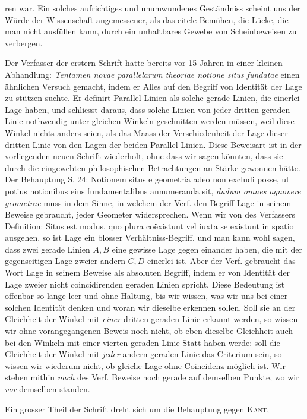 %
ren war. Ein solches aufrichtiges und unumwundenes Geständniss scheint uns der Würde der Wissenschaft angemessener, als das eitele Bemühen, die Lücke, die man nicht ausfüllen kann, durch ein unhaltbares Gewebe von Scheinbeweisen zu verbergen.

Der Verfasser der erstern Schrift hatte bereits vor 15 Jahren in einer kleinen Abhandlung: \textit{Tentamen novae parallelarum theoriae notione situs fundatae} einen ähnlichen Versuch gemacht, indem er Alles auf den Begriff von Identität der Lage zu stützen suchte. Er definirt Parallel-Linien als solche gerade Linien, die einerlei Lage haben, und schliesst daraus, dass solche Linien von jeder dritten geraden Linie nothwendig unter gleichen Winkeln geschnitten werden müssen, weil diese Winkel nichts anders seien, als das Maass der Verschiedenheit der Lage dieser dritten Linie von den Lagen der beiden Parallel-Linien. Diese Beweisart ist in der vorliegenden neuen Schrift wiederholt, ohne dass wir sagen könnten, dass sie durch die eingewebten philosophischen Betrachtungen an Stärke gewonnen hätte. Der Behauptung S. 24: Notionem situs e geometria adeo non excludi posse, ut potius notionibus eius fundamentalibus annumeranda sit, \textit{dudum omnes agnovere geometrae} muss in dem Sinne, in welchem der Verf. den Begriff Lage in seinem Beweise gebraucht, jeder Geometer widersprechen. Wenn wir von des Verfassers Definition: Situs est modus, quo plura coëxistunt vel iuxta se existunt in spatio ausgehen, so ist Lage ein blosser Verhältniss-Begriff, und man kann wohl sagen, dass zwei gerade Linien \(A,B\) eine gewisse Lage gegen einander haben, die mit der gegenseitigen Lage zweier andern \(C,D\) einerlei ist. Aber der Verf. gebraucht das Wort Lage in seinem Beweise als absoluten Begriff, indem er von Identität der Lage zweier nicht coincidirenden geraden Linien spricht. Diese Bedeutung ist offenbar so lange leer und ohne Haltung, bis wir wissen, was wir uns bei einer solchen Identität denken und woran wir dieselbe erkennen sollen. Soll sie an der Gleichheit der Winkel mit \textit{einer} dritten geraden Linie erkannt werden, so wissen wir ohne vorangegangenen Beweis noch nicht, ob eben dieselbe Gleichheit auch bei den Winkeln mit einer vierten geraden Linie Statt haben werde: soll die Gleichheit der Winkel mit \textit{jeder} andern geraden Linie das Criterium sein, so wissen wir wiederum nicht, ob gleiche Lage ohne Coincidenz möglich ist. Wir stehen mithin \textit{nach} des Verf. Beweise noch gerade auf demselben Punkte, wo wir \textit{vor} demselben standen.

Ein grosser Theil der Schrift dreht sich um die Behauptung gegen \textsc{Kant},
